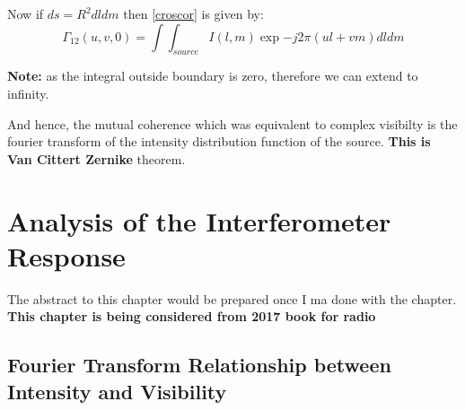 \documentclass[10pt]{report}
\newcommand{\cbox}{tcolorbox}
\begin{document}
Now if $ds=R^2dldm$ then \eqref{croscor} is given by:
\begin{equation}
\Gamma_{12}(u,v,0)=\int \int_{source} I(l,m){\exp{-j2\pi (ul+vm)}}dldm
\end{equation}

\textbf{Note:} as the integral outside boundary is zero, therefore we can extend to infinity.\\
\begin{\cbox}
And hence, the mutual coherence which was equivalent to complex visibilty is the fourier transform of the intensity distribution function of the source. \textbf{This is Van Cittert Zernike} theorem.
\end{\cbox}
\chapter{Analysis of the Interferometer Response}
The abstract to this chapter would be prepared once I ma done with the chapter. \textbf{This chapter is being considered from 2017 book for radio}
\section{Fourier Transform Relationship between Intensity and Visibility}
\end{document}
